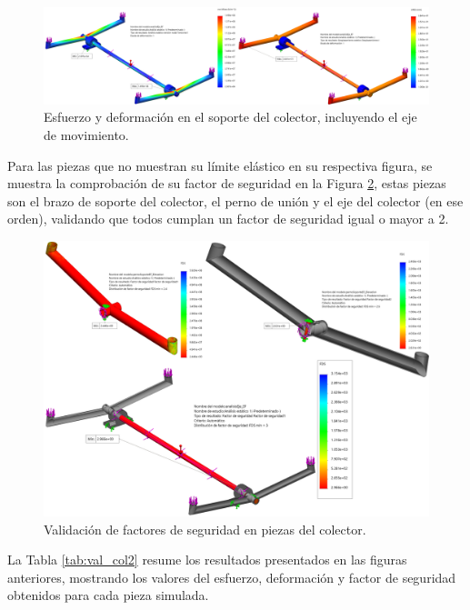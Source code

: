 \begin{figure}[H]
	\centering
	\includegraphics[width=\columnwidth]{imagenes/val_col6}
	\caption{Esfuerzo y deformación en el soporte del colector, incluyendo el eje de movimiento.}
	\label{fig:val_col6}
\end{figure}

Para las piezas que no muestran su límite elástico en su respectiva figura, se muestra la comprobación de su factor de seguridad en la Figura \ref{fig:val_col7}, estas piezas son el brazo de soporte del colector, el perno de unión y el eje del colector (en ese orden), validando que todos cumplan un factor de seguridad igual o mayor a 2.

\begin{figure}[H]
	\centering
	\includegraphics[width=11.5cm]{imagenes/val_col7}
	\caption{Validación de factores de seguridad en piezas del colector.}
	\label{fig:val_col7}
\end{figure}

La Tabla \ref{tab:val_col2} resume los resultados presentados en las figuras anteriores, mostrando los valores del esfuerzo, deformación y factor de seguridad obtenidos para cada pieza simulada.

